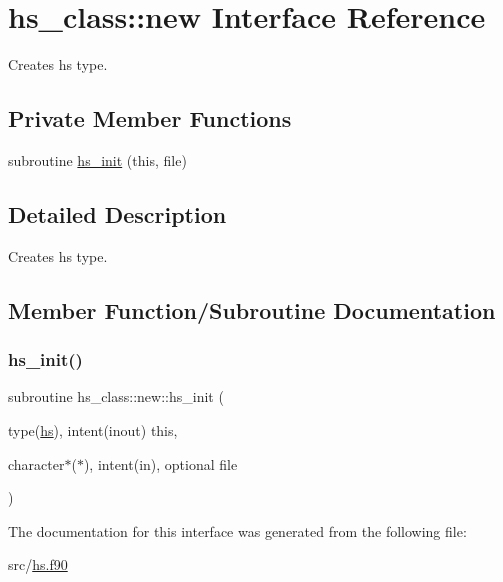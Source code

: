 \hypertarget{interfacehs__class_1_1new}{}\section{hs\+\_\+class\+:\+:new Interface Reference}
\label{interfacehs__class_1_1new}


Creates hs type.  


\subsection*{Private Member Functions}
\begin{DoxyCompactItemize}
\item 
subroutine \hyperlink{interfacehs__class_1_1new_a0813dfca062dd422e3313663eb60a34b}{hs\+\_\+init} (this, file)
\end{DoxyCompactItemize}


\subsection{Detailed Description}
Creates hs type. 

\subsection{Member Function/\+Subroutine Documentation}
\mbox{\label{interfacehs__class_1_1new_a0813dfca062dd422e3313663eb60a34b}} 
\subsubsection{\texorpdfstring{hs\+\_\+init()}{hs\_init()}}
{\footnotesize\ttfamily subroutine hs\+\_\+class\+::new\+::hs\+\_\+init (\begin{DoxyParamCaption}\item[{type(\hyperlink{strucths__class_1_1hs}{hs}), intent(inout)}]{this,  }\item[{character$\ast$($\ast$), intent(in), optional}]{file }\end{DoxyParamCaption})\hspace{0.3cm}{\ttfamily [private]}}



The documentation for this interface was generated from the following file\+:\begin{DoxyCompactItemize}
\item 
src/\hyperlink{hs_8f90}{hs.\+f90}\end{DoxyCompactItemize}
